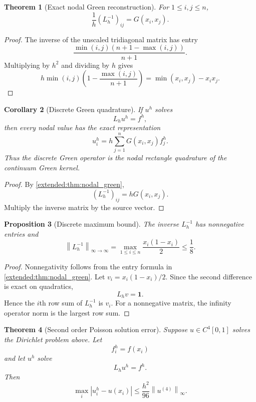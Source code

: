 \documentclass[11pt,a4paper]{article}
\newtheorem{theorem}{Theorem}[section]
\newtheorem{proposition}[theorem]{Proposition}
\newtheorem{corollary}[theorem]{Corollary}
\theoremstyle{definition}
\theoremstyle{remark}
\newcommand{\norm}[1]{\left\lVert#1\right\rVert}
\newcommand{\one}{\bm 1}
\newcommand{\abs}[1]{\left\lvert#1\right\rvert}
\begin{document}
\begin{theorem}[Exact nodal Green reconstruction]\label{extended:record:075}\label{extended:thm:nodal_green}
For \(1\leq i,j\leq n\),
\[
\frac{1}{h}(L_h^{-1})_{ij}
=
G(x_i,x_j).
\]
\end{theorem}

\begin{proof}
The inverse of the unscaled tridiagonal matrix has entry
\[
\frac{\min(i,j)(n+1-\max(i,j))}{n+1}.
\]
Multiplying by \(h^2\) and dividing by \(h\) gives
\[
h\min(i,j)
\left(1-\frac{\max(i,j)}{n+1}\right)
=
\min(x_i,x_j)-x_ix_j.
\]
\end{proof}

\begin{corollary}[Discrete Green quadrature]\label{extended:record:076}\label{extended:cor:discrete_green_quadrature}
If \(u^h\) solves
\[
L_hu^h=f^h,
\]
then every nodal value has the exact representation
\[
u_i^h
=
h\sum_{j=1}^nG(x_i,x_j)f_j^h.
\]
Thus the discrete Green operator is the nodal rectangle quadrature of the continuum Green kernel.
\end{corollary}

\begin{proof}
By \cref{extended:thm:nodal_green},
\[
(L_h^{-1})_{ij}=hG(x_i,x_j).
\]
Multiply the inverse matrix by the source vector.
\end{proof}

\begin{proposition}[Discrete maximum bound]\label{extended:record:077}\label{extended:prop:discrete_inverse_bound}
The inverse \(L_h^{-1}\) has nonnegative entries and
\[
\norm{L_h^{-1}}_{\infty\to\infty}
=
\max_{1\leq i\leq n}
\frac{x_i(1-x_i)}{2}
\leq
\frac18.
\]
\end{proposition}

\begin{proof}
Nonnegativity follows from the entry formula in \cref{extended:thm:nodal_green}. Let \(v_i=x_i(1-x_i)/2\). Since the second difference is exact on quadratics,
\[
L_hv=\one.
\]
Hence the \(i\)th row sum of \(L_h^{-1}\) is \(v_i\). For a nonnegative matrix, the infinity operator norm is the largest row sum.
\end{proof}

\begin{theorem}[Second order Poisson solution error]\label{extended:record:078}\label{extended:thm:poisson_error}
Suppose \(u\in C^4[0,1]\) solves the Dirichlet problem above. Let
\[
f^h_i=f(x_i)
\]
and let \(u^h\) solve
\[
L_hu^h=f^h.
\]
Then
\[
\max_i\abs{u^h_i-u(x_i)}
\leq
\frac{h^2}{96}
\norm{u^{(4)}}_\infty.
\]
\end{theorem}
\end{document}
